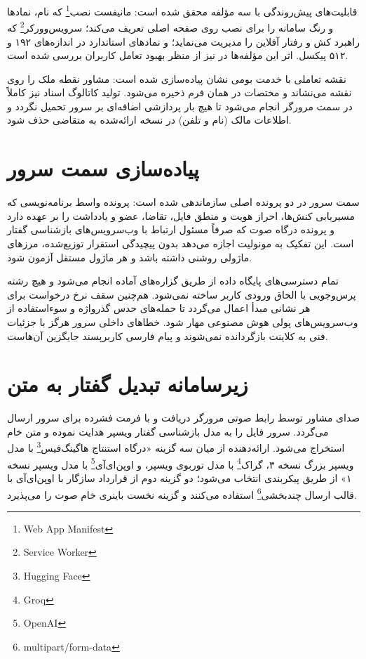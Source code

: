 \documentclass[11pt, a4paper]{report}
\newcommand{\enfootnote}[1]{\footnote{\foreignlanguage{english}{#1}}}
\begin{document}
قابلیت‌های پیش‌روندگی با سه مؤلفه محقق شده است: مانیفست نصب\enfootnote{Web App Manifest} که نام، نمادها و رنگ سامانه را برای نصب روی صفحه اصلی تعریف می‌کند؛ سرویس‌وورکر\enfootnote{Service Worker} که راهبرد کش و رفتار آفلاین را مدیریت می‌نماید؛ و نمادهای استاندارد در اندازه‌های ۱۹۲ و ۵۱۲ پیکسل. اثر این مؤلفه‌ها در \cite{pwa} نیز از منظر بهبود تعامل کاربران بررسی شده است.

نقشه تعاملی با خدمت بومی نشان پیاده‌سازی شده است: مشاور نقطه ملک را روی نقشه می‌نشاند و مختصات در همان فرم ذخیره می‌شود. تولید کاتالوگ اسناد نیز کاملاً در سمت مرورگر انجام می‌شود تا هیچ بار پردازشی اضافه‌ای بر سرور تحمیل نگردد و اطلاعات مالک (نام و تلفن) در نسخه ارائه‌شده به متقاضی حذف شود.

\section{پیاده‌سازی سمت سرور}
سمت سرور در دو پرونده اصلی سازماندهی شده است: پرونده واسط برنامه‌نویسی که مسیریابی کنش‌ها، احراز هویت و منطق فایل، تقاضا، عضو و یادداشت را بر عهده دارد و پرونده درگاه صوت که صرفاً مسئول ارتباط با وب‌سرویس‌های بازشناسی گفتار است. این تفکیک به مونولیت اجازه می‌دهد بدون پیچیدگی استقرار توزیع‌شده، مرزهای ماژولی روشنی داشته باشد و هر ماژول مستقل آزمون شود.

تمام دسترسی‌های پایگاه داده از طریق گزاره‌های آماده انجام می‌شود و هیچ رشته پرس‌وجویی با الحاق ورودی کاربر ساخته نمی‌شود. هم‌چنین سقف نرخ درخواست برای هر نشانی مبدأ اعمال می‌گردد تا حمله‌های حدس گذرواژه و سوءاستفاده از وب‌سرویس‌های پولی هوش مصنوعی مهار شود. خطاهای داخلی سرور هرگز با جزئیات فنی به کلاینت بازگردانده نمی‌شوند و پیام فارسی کاربرپسند جایگزین آن‌هاست.

\section{زیرسامانه تبدیل گفتار به متن}
صدای مشاور توسط رابط صوتی مرورگر دریافت و با فرمت فشرده برای سرور ارسال می‌گردد. سرور فایل را به مدل بازشناسی گفتار ویسپر هدایت نموده و متن خام استخراج می‌شود. ارائه‌دهنده از میان سه گزینه «درگاه استنتاج هاگینگ‌فیس\enfootnote{Hugging Face} با مدل ویسپر بزرگ نسخه ۳، گراک\enfootnote{Groq} با مدل توربوی ویسپر، و اوپن‌ای‌آی\enfootnote{OpenAI} با مدل ویسپر نسخه ۱» از طریق پیکربندی انتخاب می‌شود؛ دو گزینه دوم از قرارداد سازگار با اوپن‌ای‌آی با قالب ارسال چندبخشی\enfootnote{multipart/form-data} استفاده می‌کنند و گزینه نخست باینری خام صوت را می‌پذیرد.
\end{document}
